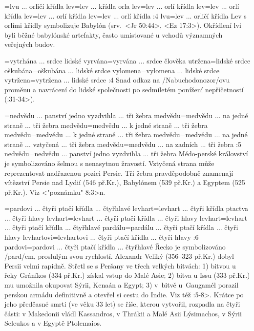 ={lvu ... orličí křídla}  %
   {lev}={lev ... křídla orla}   %
   {lev}={lev ... orlí křídla}   %
   {lev}={lev ... orlí křídla}   %
   {lev}={lev ... orlí křídla}   %
   {lev}={lev ... orlí křídla}   %
:4 {lvu}={lev ... orličí křídla} 
     Lev s orlími křídly symbolizuje Babylón (srv.~<Jr 50:44>, <Ez 17:3>).
     Okřídlení lvi byli běžné babylónské artefakty, často umisťované u vchodů významných veřejných budov.      
     
={vytrhána ... srdce lidské}   %
   {vyrvána}={vyrvána ... srdce člověka}   %
   {utržena}={lidské srdce}   %
   {oškubána}={oškubána ... lidské srdce}   %
   {vylomena}={vylomena ... lidské srdce}   %
   {vytržena}={vytržena ... lidské srdce}   %
:4 {} Snad odkaz na \x/Nabuchodonozor/ovu
     proměnu a navrácení do lidské společnosti po sedmiletém ponížení nepříčetností
     (:31-34>).

={nedvědu ... panství jedno vyzdvihla ... tři žebra}    %
   {medvědu}={medvědu ... na jedné straně ... tři žebra}   %
   {medvědu}={medvědu ... k jedné straně ... tři žebra}   %
   {medvědu}={medvědu ... k jedné straně ... tři žebra}   %
   {medvědu}={medvědu ... na jedné straně ... vztyčená ... tři žebra}   %
   {medvědu}={medvědu ... na zadních ...  tři žebra}   %
:5 {nedvědu}={nedvědu ... panství jedno vyzdvihla ... tři žebra} 
     Médo-perské království je symbolizováno šelmou s nenasytnou žravostí. Vztyčená
     strana může reprezentovat nadřazenou pozici Persie. Tři žebra pravděpodobně znamenají
     vítězství Persie nad Lydií (546 př.Kr.), Babylónem (539 př.Kr.) a Egyptem (525 př.Kr.).
     Viz <"poznámku" 8:3>n.

={pardovi ... čtyři ptačí křídla ... čtyřhlavé}  %
   {levhart}={levhart ... čtyři křídla ptactva ...  čtyři hlavy}   %
   {levhart}={levhart ... čtyři ptačí křídla ... čtyři hlavy}    %
   {levhart}={levhart ... čtyři ptačí křídla ... čtyřhlavé}    %
   {pardálu}={pardálu ... čtyři ptačí křídla ... čtyři hlavy}    %
   {levhartovi}={levhartovi ... čtyři ptačí křídla ... čtyři hlavy}    %
:6 {pardovi}={pardovi ... čtyři ptačí křídla ... čtyřhlavé}
     Řecko je symbolizováno \x/pard/em, proslulým svou rychlostí.
     Alexandr Veliký (356--323 př.Kr.) dobyl Persii velmi rapidně.
     Střetl se s Peršany ve třech velkých bitvách:
     1) bitvou u řeky Gráníkos (334 př.Kr.) získal vstup do Malé Asie; 
     2) bitva u Issu (333 př.Kr.) mu umožnila okupovat Sýrii, Kenaán a Egypt; 
     3) v~bitvě u~Gaugamél porazil perskou armádu definitivně a otevřel si cestu do Indie.
        Viz též :5-8>. Krátce po jeho předčasné smrti (ve věku 33 let) se říše, kterou
        vytvořil, rozpadla na čtyři části: v Makedonii vládl Kassandros, v Thrákii a Malé Asii
        Lýsimachos, v Sýrii Seleukos a v Egyptě Ptolemaios.

